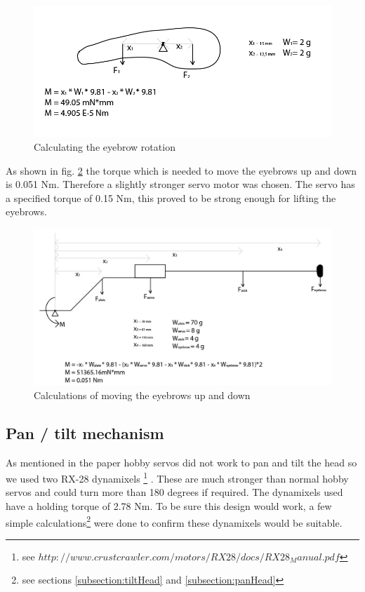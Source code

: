 \documentclass[technical_document.tex]{subfiles}
\begin{document}
\begin{figure}[ht!]
	\centering
	\mbox{\includegraphics[scale=0.4]{Images/eyebrow_rotate.png}}
	\caption{Calculating the eyebrow rotation}
	\label{fig:eyebrow_rotate}
\end{figure}

As shown in fig. \ref{fig:eyebrow_upDown} the torque which is needed to move the eyebrows up and down is 0.051 Nm. Therefore a slightly stronger servo motor was chosen. The servo has a specified torque of 0.15 Nm, this proved to be strong enough for lifting the eyebrows.

\begin{figure}[ht!]
	\centering
	\mbox{\includegraphics[scale=0.4]{Images/eyebrow_upDown.png}}
	\caption{Calculations of moving the eyebrows up and down}
	\label{fig:eyebrow_upDown}
\end{figure}


\subsection{Pan / tilt mechanism}

As mentioned in the paper %
hobby servo\textquotesingle{}s did not work to pan and tilt the head so we used two RX-28 dynamixels \footnote{see $http://www.crustcrawler.com/motors/RX28/docs/RX28_Manual.pdf$} %
. These are much stronger than normal hobby servo\textquotesingle{}s and could turn more than 180 degrees if required. The dynamixels used have a holding torque of 2.78 Nm. To be sure this design would work, a few simple calculations\footnote{see sections \ref{subsection:tiltHead} and \ref{subsection:panHead}} were done to confirm these dynamixels would be suitable.
\end{document}
